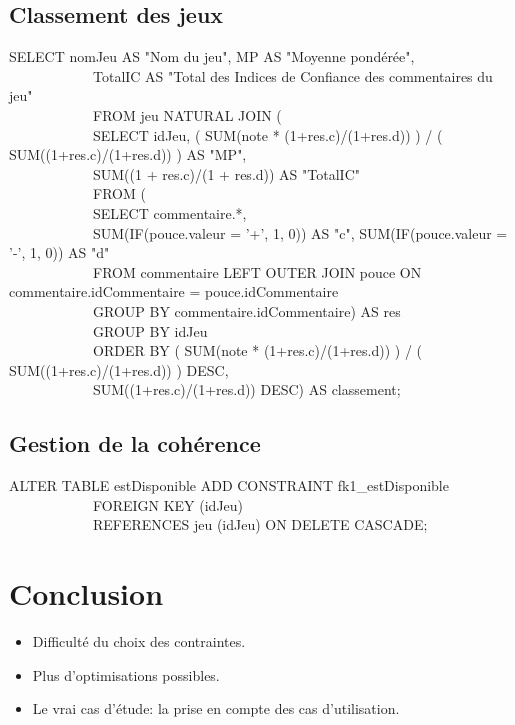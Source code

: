 \documentclass{beamer}
\begin{document}
\subsection{Classement des jeux}
\begin{frame}
\begin{center}
SELECT nomJeu AS "Nom du jeu", MP AS "Moyenne pondérée", \\
\ \ \ \ \ \ \ \ \ \ \ \        TotalIC AS "Total des Indices de Confiance des commentaires du jeu" \\
\ \ \ \ \ \ \ \ \ \ \ \ FROM jeu NATURAL JOIN ( \\
\ \ \ \ \ \ \ \ \ \ \ \   SELECT idJeu, ( SUM(note * (1+res.c)/(1+res.d)) ) / ( SUM((1+res.c)/(1+res.d)) ) AS "MP", \\
\ \ \ \ \ \ \ \ \ \ \ \          SUM((1 + res.c)/(1 + res.d)) AS "TotalIC" \\
\ \ \ \ \ \ \ \ \ \ \ \   FROM ( \\
\ \ \ \ \ \ \ \ \ \ \ \      SELECT commentaire.*, \\
\ \ \ \ \ \ \ \ \ \ \ \             SUM(IF(pouce.valeur = '+', 1, 0)) AS "c", SUM(IF(pouce.valeur = '-', 1, 0)) AS "d" \\
\ \ \ \ \ \ \ \ \ \ \ \      FROM commentaire LEFT OUTER JOIN pouce ON commentaire.idCommentaire = pouce.idCommentaire \\
\ \ \ \ \ \ \ \ \ \ \ \      GROUP BY commentaire.idCommentaire) AS res \\
\ \ \ \ \ \ \ \ \ \ \ \   GROUP BY idJeu \\
\ \ \ \ \ \ \ \ \ \ \ \   ORDER BY ( SUM(note * (1+res.c)/(1+res.d)) ) / ( SUM((1+res.c)/(1+res.d)) ) DESC, \\
\ \ \ \ \ \ \ \ \ \ \ \            SUM((1+res.c)/(1+res.d)) DESC) AS classement; \\
\end{center}
\end{frame}

\subsection{Gestion de la cohérence}
\begin{frame}
ALTER TABLE estDisponible ADD CONSTRAINT fk1\_estDisponible \\
\ \ \ \ \ \ \ \ \ \ \ \ FOREIGN KEY (idJeu) \\
\ \ \ \ \ \ \ \ \ \ \ \ REFERENCES jeu (idJeu) ON DELETE CASCADE;
\end{frame}

\section*{Conclusion}
\begin{frame}
\begin{block}{}
\begin{center}
\begin{itemize}
\item Difficulté du choix des contraintes.
\item Plus d'optimisations possibles.
\item Le vrai cas d'étude: la prise en compte des cas d'utilisation.
\end{itemize}
\end{center}
\end{block}
\end{frame}
\end{document}
